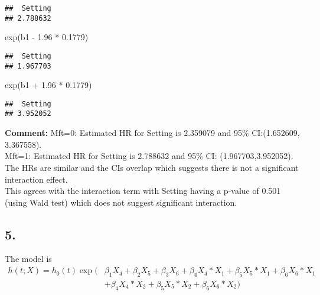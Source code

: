 \documentclass[
]{article}
\newenvironment{Shaded}{\begin{snugshade}}{\end{snugshade}}
\newcommand{\FloatTok}[1]{\textcolor[rgb]{0.00,0.00,0.81}{#1}}
\newcommand{\FunctionTok}[1]{\textcolor[rgb]{0.00,0.00,0.00}{#1}}
\newcommand{\NormalTok}[1]{#1}
\newcommand{\SpecialCharTok}[1]{\textcolor[rgb]{0.00,0.00,0.00}{#1}}
\begin{document}
\begin{verbatim}
##  Setting 
## 2.788632
\end{verbatim}

\begin{Shaded}
\begin{Highlighting}[]
\FunctionTok{exp}\NormalTok{(b1 }\SpecialCharTok{{-}} \FloatTok{1.96} \SpecialCharTok{*} \FloatTok{0.1779}\NormalTok{)}
\end{Highlighting}
\end{Shaded}

\begin{verbatim}
##  Setting 
## 1.967703
\end{verbatim}

\begin{Shaded}
\begin{Highlighting}[]
\FunctionTok{exp}\NormalTok{(b1 }\SpecialCharTok{+} \FloatTok{1.96} \SpecialCharTok{*} \FloatTok{0.1779}\NormalTok{)}
\end{Highlighting}
\end{Shaded}

\begin{verbatim}
##  Setting 
## 3.952052
\end{verbatim}

\textbf{Comment:} Mft=0: Estimated HR for Setting is 2.359079 and 95\%
CI:(1.652609, 3.367558).\\
Mft=1: Estimated HR for Setting is 2.788632 and 95\% CI:
(1.967703,3.952052).\\
The HRs are similar and the CIs overlap which suggests there is not a
significant interaction effect.\\
This agrees with the interaction term with Setting having a p-value of
0.501 (using Wald test) which does not suggest significant interaction.

\hypertarget{section}{%
\subsection{5.}\label{section}}

The model is \begin{align*}
h(t;X)=h_0(t)\exp(&\beta_1 X_4 +  \beta_2 X_5 + \beta_3 X_6 + \beta_4 X_4*X_1 + \beta_5 X_5*X_1 + \beta_6 X_6*X_1 \\
                  &+\beta_4 X_4*X_2 + \beta_5 X_5*X_2 + \beta_6 X_6*X_2)
\end{align*}
\end{document}
